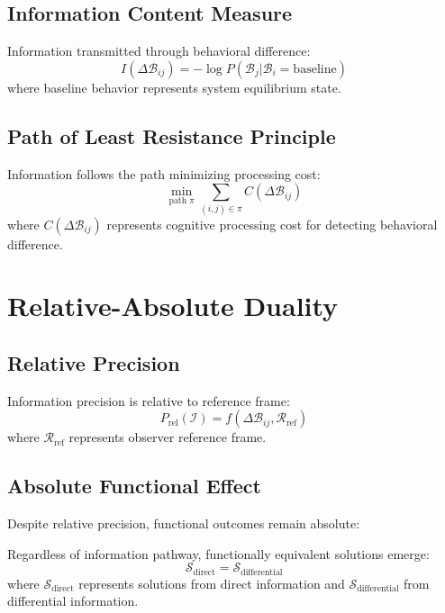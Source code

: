 \documentclass{article}
\begin{document}
\subsection{Information Content Measure}
\begin{definition}
Information transmitted through behavioral difference:
$$I(\Delta \mathcal{B}_{ij}) = -\log P(\mathcal{B}_j | \mathcal{B}_i = \text{baseline})$$
where baseline behavior represents system equilibrium state.
\end{definition}

\subsection{Path of Least Resistance Principle}
\begin{theorem}
Information follows the path minimizing processing cost:
$$\min_{\text{path } \pi} \sum_{(i,j) \in \pi} C(\Delta \mathcal{B}_{ij})$$
where $C(\Delta \mathcal{B}_{ij})$ represents cognitive processing cost for detecting behavioral difference.
\end{theorem}

\section{Relative-Absolute Duality}

\subsection{Relative Precision}
Information precision is relative to reference frame:
$$P_{\text{rel}}(\mathcal{I}) = f(\Delta \mathcal{B}_{ij}, \mathcal{R}_{\text{ref}})$$
where $\mathcal{R}_{\text{ref}}$ represents observer reference frame.

\subsection{Absolute Functional Effect}
Despite relative precision, functional outcomes remain absolute:
\begin{theorem}
Regardless of information pathway, functionally equivalent solutions emerge:
$$\mathcal{S}_{\text{direct}} = \mathcal{S}_{\text{differential}}$$
where $\mathcal{S}_{\text{direct}}$ represents solutions from direct information and $\mathcal{S}_{\text{differential}}$ from differential information.
\end{theorem}
\end{document}
